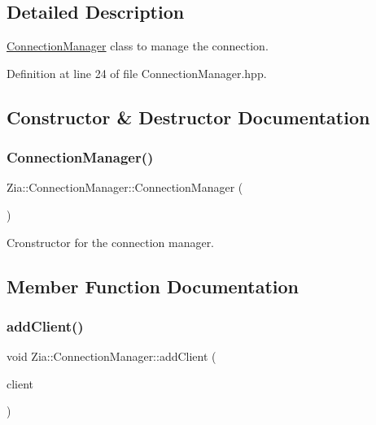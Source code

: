\subsection{Detailed Description}
\hyperlink{class_zia_1_1_connection_manager}{Connection\+Manager} class to manage the connection. 

Definition at line 24 of file Connection\+Manager.\+hpp.



\subsection{Constructor \& Destructor Documentation}
\mbox{\label{class_zia_1_1_connection_manager_a863585668f747d6fb35b15b12f6fb4a4}} 
\subsubsection{\texorpdfstring{Connection\+Manager()}{ConnectionManager()}}
{\footnotesize\ttfamily Zia\+::\+Connection\+Manager\+::\+Connection\+Manager (\begin{DoxyParamCaption}{ }\end{DoxyParamCaption})\hspace{0.3cm}{\ttfamily [default]}}



Cronstructor for the connection manager. 



\subsection{Member Function Documentation}
\mbox{\label{class_zia_1_1_connection_manager_a556bcbe3969171deba4900c08feb7d93}} 
\subsubsection{\texorpdfstring{add\+Client()}{addClient()}}
{\footnotesize\ttfamily void Zia\+::\+Connection\+Manager\+::add\+Client (\begin{DoxyParamCaption}\item[{\hyperlink{_connection_manager_8hpp_a0e374529952c927bd9f59c9acbccf624}{Connection\+Ptr}}]{client }\end{DoxyParamCaption})}



